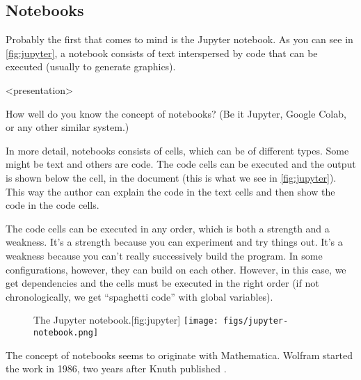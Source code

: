 \subsection{Notebooks}

Probably the first that comes to mind is the Jupyter notebook.
As you can see in \cref{fig:jupyter}, a notebook consists of text interspersed 
by code that can be executed (usually to generate graphics).

\begin{frame}<presentation>
\begin{activity}\label{AnalyseNotebooks}
How well do you know the concept of notebooks?
(Be it Jupyter, Google Colab, or any other similar system.)
\end{activity}
\end{frame}

In more detail, notebooks consists of cells, which can be of different types.
Some might be text and others are code.
The code cells can be executed and the output is shown below the cell, in the 
document (this is what we see in \cref{fig:jupyter}).
This way the author can explain the code in the text cells and then show the 
code in the code cells.

The code cells can be executed in any order, which is both a strength and a 
weakness.
It's a strength because you can experiment and try things out.
It's a weakness because you can't really successively build the program.
In some configurations, however, they can build on each other.
However, in this case, we get dependencies and the cells must be executed in 
the right order (if not chronologically, we get \enquote{spaghetti code} with 
global variables).

\begin{frame}
\begin{figure}[b]
  \begin{sidecaption}{The Jupyter notebook.}[fig:jupyter]
  \raggedleft
  \texttt{[image: figs/jupyter-notebook.png]}
  \end{sidecaption}
\end{figure}
\end{frame}

\begin{frame}
\begin{remark}
  The concept of notebooks seems to originate with 
  Mathematica\autocite{Wolfram1988}.
  Wolfram started the work in 1986, two years after Knuth published 
  .
\end{remark}
\end{frame}

